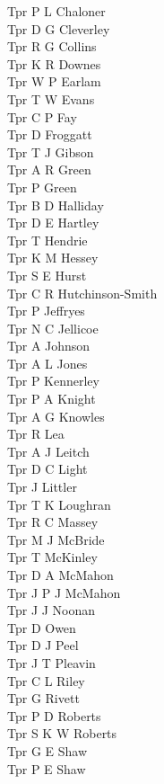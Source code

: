 \begin{multicols}{4}
  Tpr P L Chaloner \\
  Tpr D G Cleverley \\
  Tpr R G Collins \\
  Tpr K R Downes \\
  Tpr W P Earlam \\
  Tpr T W Evans \\
  Tpr C P Fay \\
  Tpr D Froggatt \\
  Tpr T J Gibson \\
  Tpr A R Green \\
  Tpr P Green \\
  Tpr B D Halliday \\
  Tpr D E Hartley \\
  Tpr T Hendrie \\
  Tpr K M Hessey \\
  Tpr S E Hurst \\
  Tpr C R Hutchinson-Smith \\
  Tpr P Jeffryes \\
  Tpr N C Jellicoe \\
  Tpr A Johnson \\
  Tpr A L Jones \\
  Tpr P Kennerley \\
  Tpr P A Knight \\
  Tpr A G Knowles \\
  Tpr R Lea \\
  Tpr A J Leitch \\
  Tpr D C Light \\
  Tpr J Littler \\
  Tpr T K Loughran \\
  Tpr R C Massey \\
  Tpr M J McBride \\
  Tpr T McKinley \\
  Tpr D A McMahon \\
  Tpr J P J McMahon \\
  Tpr J J Noonan \\
  Tpr D Owen \\
  Tpr D J Peel \\
  Tpr J T Pleavin \\
  Tpr C L Riley \\
  Tpr G Rivett \\
  Tpr P D Roberts \\
  Tpr S K W Roberts \\
  Tpr G E Shaw \\
  Tpr P E Shaw \\

\end{multicols}
